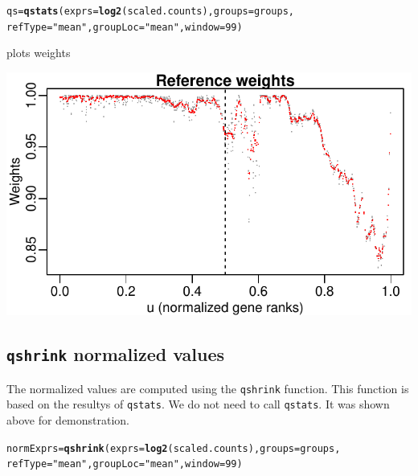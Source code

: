 \documentclass{article}\usepackage[]{graphicx}\usepackage[usenames,dvipsnames]{color}
\makeatletter
\def\maxwidth{ %
  \ifdim\Gin@nat@width>\linewidth
    \linewidth
  \else
    \Gin@nat@width
  \fi
}
\newcommand{\hlnum}[1]{\textcolor[rgb]{0.686,0.059,0.569}{#1}}%
\newcommand{\hlstr}[1]{\textcolor[rgb]{0.192,0.494,0.8}{#1}}%
\newcommand{\hlstd}[1]{\textcolor[rgb]{0.345,0.345,0.345}{#1}}%
\newcommand{\hlkwb}[1]{\textcolor[rgb]{0.69,0.353,0.396}{#1}}%
\newcommand{\hlkwc}[1]{\textcolor[rgb]{0.333,0.667,0.333}{#1}}%
\newcommand{\hlkwd}[1]{\textcolor[rgb]{0.737,0.353,0.396}{\textbf{#1}}}%
\newenvironment{kframe}{%
 \def\at@end@of@kframe{}%
 \ifinner\ifhmode%
  \def\at@end@of@kframe{\end{minipage}}%
  \begin{minipage}{\columnwidth}%
 \fi\fi%
 \def\FrameCommand##1{\hskip\@totalleftmargin \hskip-\fboxsep
 \colorbox{shadecolor}{##1}\hskip-\fboxsep
     \hskip-\linewidth \hskip-\@totalleftmargin \hskip\columnwidth}%
 \MakeFramed {\advance\hsize-\width
   \@totalleftmargin\z@ \linewidth\hsize
   \@setminipage}}%
 {\par\unskip\endMakeFramed%
 \at@end@of@kframe}
\newenvironment{knitrout}{}{} %
\makeatother
\begin{document}
\begin{knitrout}
\color{fgcolor}\begin{kframe}
\begin{alltt}
\hlstd{qs} \hlkwb{=} \hlkwd{qstats}\hlstd{(}\hlkwc{exprs}\hlstd{=}\hlkwd{log2}\hlstd{(scaled.counts),} \hlkwc{groups}\hlstd{=groups,}
            \hlkwc{refType}\hlstd{=}\hlstr{"mean"}\hlstd{,} \hlkwc{groupLoc}\hlstd{=}\hlstr{"mean"}\hlstd{,} \hlkwc{window}\hlstd{=}\hlnum{99}\hlstd{)}
\end{alltt}
\end{kframe}
\end{knitrout}

plots weights
\begin{knitrout}
\color{fgcolor}

{\centering \includegraphics[width=\maxwidth]{figure/weights-1} 

}



\end{knitrout}


\subsection{\texttt{qshrink} normalized values}

The normalized values are computed using the 
\texttt{qshrink} function. 
This function is based on the resultys of \texttt{qstats}.
We do not need to call \texttt{qstats}. It was shown 
above for demonstration.

\begin{knitrout}
\color{fgcolor}\begin{kframe}
\begin{alltt}
\hlstd{normExprs} \hlkwb{=} \hlkwd{qshrink}\hlstd{(}\hlkwc{exprs}\hlstd{=}\hlkwd{log2}\hlstd{(scaled.counts),} \hlkwc{groups}\hlstd{=groups,}
                    \hlkwc{refType}\hlstd{=}\hlstr{"mean"}\hlstd{,} \hlkwc{groupLoc}\hlstd{=}\hlstr{"mean"}\hlstd{,} \hlkwc{window}\hlstd{=}\hlnum{99}\hlstd{)}
\end{alltt}
\end{kframe}
\end{knitrout}
\end{document}
